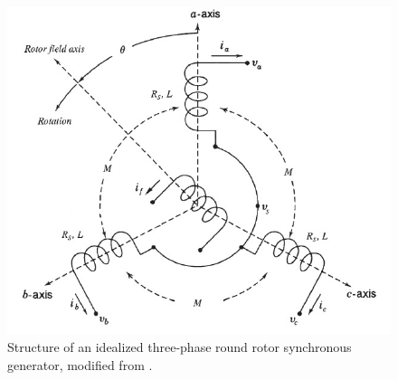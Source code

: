 \documentclass[conference]{IEEEtran}
\begin{document}
\begin{figure}
\begin{centering}
\includegraphics[scale=0.4]{SGStucture}
\par\end{centering} \label{fig:structOfSG}

\caption[Structure of an idealized three-phase round rotor synchronous
generator]{Structure of an idealized three-phase round rotor
synchronous generator, modified from \cite[Figure 3.4]{GrSt2014}.}
\end{figure}
\end{document}
